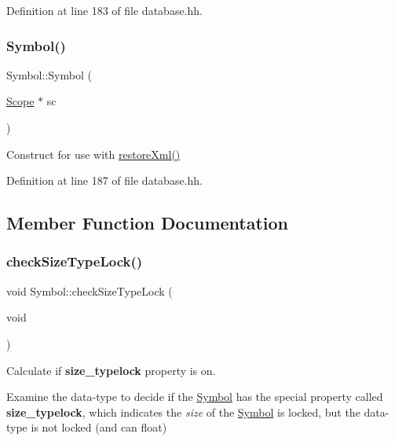 Definition at line 183 of file database.\+hh.

\mbox{\label{class_symbol_a133463e4ef55968c58bd483ab683a0c1}} 
\subsubsection{\texorpdfstring{Symbol()}{Symbol()}\hspace{0.1cm}{\footnotesize\ttfamily [2/2]}}
{\footnotesize\ttfamily Symbol\+::\+Symbol (\begin{DoxyParamCaption}\item[{\mbox{\hyperlink{class_scope}{Scope}} $\ast$}]{sc }\end{DoxyParamCaption})\hspace{0.3cm}{\ttfamily [inline]}}



Construct for use with \mbox{\hyperlink{class_symbol_a3266a5752c208bdfa5a28e792de67604}{restore\+Xml()}} 



Definition at line 187 of file database.\+hh.



\subsection{Member Function Documentation}
\mbox{\label{class_symbol_a879a1fc513f5ffac31a0ed86a52c562c}} 
\subsubsection{\texorpdfstring{checkSizeTypeLock()}{checkSizeTypeLock()}}
{\footnotesize\ttfamily void Symbol\+::check\+Size\+Type\+Lock (\begin{DoxyParamCaption}\item[{void}]{ }\end{DoxyParamCaption})\hspace{0.3cm}{\ttfamily [protected]}}



Calculate if {\bfseries{size\+\_\+typelock}} property is on. 

Examine the data-\/type to decide if the \mbox{\hyperlink{class_symbol}{Symbol}} has the special property called {\bfseries{size\+\_\+typelock}}, which indicates the {\itshape size} of the \mbox{\hyperlink{class_symbol}{Symbol}} is locked, but the data-\/type is not locked (and can float) 

